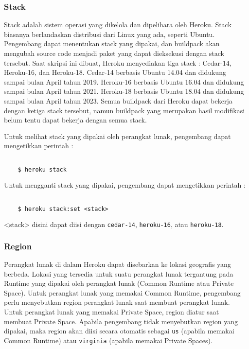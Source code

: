 \subsubsection{Stack}
Stack adalah sistem operasi yang dikelola dan dipelihara oleh Heroku. Stack biasanya berlandaskan distribusi dari Linux yang ada, seperti Ubuntu. Pengembang dapat menentukan stack yang dipakai, dan buildpack akan mengubah source code menjadi paket yang dapat dieksekusi dengan stack tersebut. Saat skripsi ini dibuat, Heroku menyediakan tiga stack : Cedar-14, Heroku-16, dan Heroku-18. Cedar-14 berbasis Ubuntu 14.04 dan didukung sampai bulan April tahun 2019. Heroku-16 berbasis Ubuntu 16.04 dan didukung sampai bulan April tahun 2021. Heroku-18 berbasis Ubuntu 18.04 dan didukung sampai bulan April tahun 2023. Semua buildpack dari Heroku dapat bekerja dengan ketiga stack tersebut, namun buildpack yang merupakan hasil modifikasi belum tentu dapat bekerja dengan semua stack.

Untuk melihat stack yang dipakai oleh perangkat lunak, pengembang dapat mengetikkan perintah :
\begin{lstlisting}

	$ heroku stack

\end{lstlisting}

Untuk mengganti stack yang dipakai, pengembang dapat mengetikkan perintah :
\begin{lstlisting}

	$ heroku stack:set <stack>

\end{lstlisting}
<stack> disini dapat diisi dengan \texttt{cedar-14}, \texttt{heroku-16}, atau \texttt{heroku-18}.

\subsubsection{Region}
Perangkat lunak di dalam Heroku dapat disebarkan ke lokasi geografis yang berbeda. Lokasi yang tersedia untuk suatu perangkat lunak tergantung pada Runtime yang dipakai oleh perangkat lunak (Common Runtime atau Private Space). Untuk perangkat lunak yang memakai Common Runtime, pengembang perlu menyebutkan region perangkat lunak saat membuat perangkat lunak. Untuk perangkat lunak yang memakai Private Space, region diatur saat membuat Private Space. Apabila pengembang tidak menyebutkan region yang dipakai, maka region akan diisi secara otomatis sebagai \texttt{us} (apabila memakai Common Runtime) atau \texttt{virginia} (apabila memakai Private Spaces).

